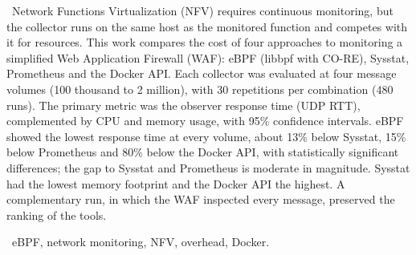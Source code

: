 \documentclass{ieeeaccess}
\let\origtable\table \let\endorigtable\endtable
\newcommand{\widetables}{\renewenvironment{table}[1][tbp]{\csname table*\endcsname[t]\small\renewcommand{\arraystretch}{1.25}}{\csname endtable*\endcsname}}
\newcommand{\narrowtables}{\renewenvironment{table}[1][tbp]{\origtable[##1]\setlength{\textwidth}{\columnwidth}\small\renewcommand{\arraystretch}{1.25}}{\endorigtable}}
\begin{document}
\ \footnotesize Network Functions Virtualization (NFV) requires continuous monitoring, but the collector runs on the same host as the monitored function and competes with it for resources. This work compares the cost of four approaches to monitoring a simplified Web Application Firewall (WAF): eBPF (libbpf with CO-RE), Sysstat, Prometheus and the Docker API. Each collector was evaluated at four message volumes (100 thousand to 2 million), with 30 repetitions per combination (480 runs). The primary metric was the observer response time (UDP RTT), complemented by CPU and memory usage, with 95\% confidence intervals. eBPF showed the lowest response time at every volume, about 13\% below Sysstat, 15\% below Prometheus and 80\% below the Docker API, with statistically significant differences; the gap to Sysstat and Prometheus is moderate in magnitude. Sysstat had the lowest memory footprint and the Docker API the highest. A complementary run, in which the WAF inspected every message, preserved the ranking of the tools.

\ eBPF, network monitoring, NFV, overhead, Docker.\normalsize

\renewcommand{\textbf}[1]{{\bfseries #1}}

\widetables

\narrowtables

\widetables

\narrowtables





\EOD
\end{document}
